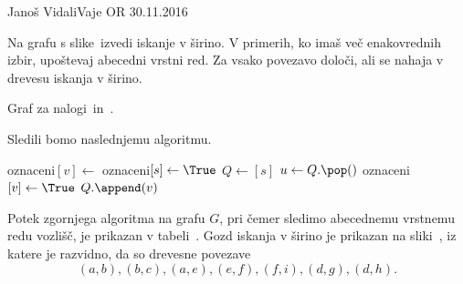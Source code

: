 
\begin{naloga}{Janoš Vidali}{Vaje OR 30.11.2016}
\begin{vprasanje}
Na grafu s slike~\fig izvedi iskanje v širino.
V primerih, ko imaš več ena\-ko\-vred\-nih izbir,
upoštevaj abecedni vrstni red.
Za vsako povezavo določi, ali se nahaja v drevesu iskanja v širino.

\begin{slika}
\pgfslika
\caption{Graf za nalogi~\nal in~\nal[dfs].}
\end{slika}
\end{vprasanje}

\begin{odgovor}
Sledili bomo naslednjemu algoritmu.
\begin{small}
\begin{algorithmic}
		\State oznaceni$[v] \gets$ \False
	\EndFor
			\State oznaceni$[s] \gets \True$
			\State $Q \gets [s]$
				\State $u \gets Q.\pop()$
						\State oznaceni$[v] \gets \True$
						\State $Q.\append(v)$
					\EndIf
				\EndFor
			\EndWhile
		\EndIf
	\EndFor
\end{algorithmic}
\end{small}
%
Potek zgornjega algoritma na grafu $G$,
pri čemer sledimo abecednemu vrstnemu redu vozlišč,
je prikazan v tabeli~\tab.
Gozd iskanja v širino je prikazan na sliki~,
iz katere je razvidno, da so drevesne povezave
$$
(a, b), (b, c), (a, e), (e, f), (f, i), (d, g), (d, h).
$$


\end{odgovor}
\end{naloga}
